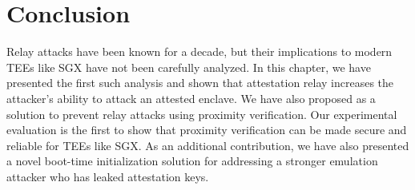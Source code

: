 \section{Conclusion}
\label{sec:conclusion_promimitee}

Relay attacks have been known for a decade, but their implications to modern TEEs like SGX have not been carefully analyzed. In this chapter, we have presented the first such analysis and shown that attestation relay increases the attacker's ability to attack an attested enclave. We have also proposed \name as a solution to prevent relay attacks using proximity verification. Our experimental evaluation is the first to show that proximity verification can be made secure and reliable for TEEs like SGX. As an additional contribution, we have also presented a novel boot-time initialization solution for addressing a stronger emulation attacker who has leaked attestation keys.